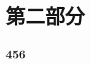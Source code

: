 \documentclass[10pt,mathserif]{beamer}%
\begin{document}
\part{第二部分}

\section{456}
\begin{frame}[fragile]
    \frametitle{\currentdeepesttitle}
    \begin{spacing}{1.5}
    \setlength{\parindent}{2em}
        
    \end{spacing}
\end{frame}


{\xdbg
\begin{frame}
\end{frame}}
\end{document}
